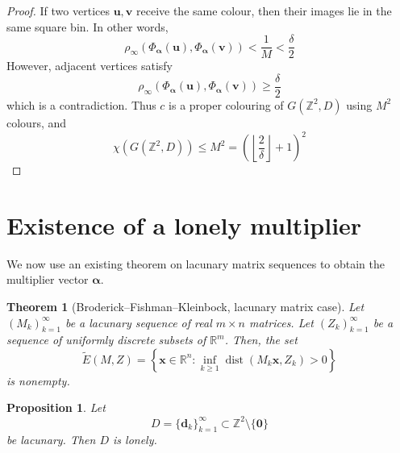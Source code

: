 \documentclass[11pt,fleqn]{article}
\newtheorem{theorem}{Theorem}
\newtheorem{proposition}{Proposition}
\newcommand{\Z}{\mathbb{Z}}
\newcommand{\R}{\mathbb{R}}
\newcommand{\floor}[1]{\left\lfloor#1\right\rfloor}
\newcommand{\dist}{\operatorname{dist}}
\begin{document}
\begin{proof}
If two vertices $\mathbf u,\mathbf v$ receive the same colour, then their images lie in the same square bin. In other words,
\[
\rho_\infty\!\left(
\Phi_{\boldsymbol\alpha}(\mathbf u),
\Phi_{\boldsymbol\alpha}(\mathbf v)
\right)
<
\frac1M
<
\frac{\delta}{2}
\]
However, adjacent vertices satisfy
\[
\rho_\infty\!\left(
\Phi_{\boldsymbol\alpha}(\mathbf u),
\Phi_{\boldsymbol\alpha}(\mathbf v)
\right)
\ge
\frac{\delta}{2}
\]
which is a contradiction.
Thus $c$ is a proper colouring of $G(\Z^2,D)$ using $M^2$ colours, and
\[
\chi(G(\Z^2,D))
\le
M^2
=
\left(\floor{\frac{2}{\delta}}+1\right)^2
\]
\end{proof}

\section{Existence of a lonely multiplier}

We now use an existing theorem on lacunary matrix sequences to obtain the multiplier vector $\boldsymbol\alpha$.

\begin{theorem}[Broderick--Fishman--Kleinbock, lacunary matrix case]
Let $(M_k)_{k=1}^{\infty}$ be a lacunary sequence of real $m\times n$ matrices. Let $(Z_k)_{k=1}^{\infty}$ be a sequence of uniformly discrete subsets of $\R^m$. Then, the set
\[
\widetilde E(M,Z)
=
\left\{
\mathbf x\in \R^n:
\inf_{k\ge 1}\dist(M_k\mathbf x,Z_k)>0
\right\}
\]
is nonempty.
\end{theorem}

\begin{proposition}
Let
\[
D=\{\mathbf d_k\}_{k=1}^{\infty}\subset \Z^2\setminus\{\mathbf 0\}
\]
be lacunary. Then $D$ is lonely.
\end{proposition}
\end{document}
